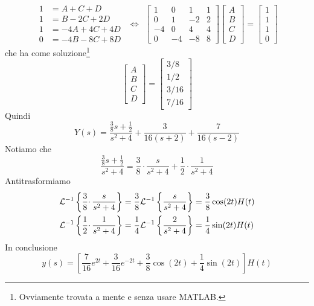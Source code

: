 \begin{equation*}
\begin{aligned}
1 & =A+C+D\\
1 & =B-2C+2D\\
1 & =-4A+4C+4D\\
0 & =-4B-8C+8D
\end{aligned} \ \ \iff \ \ \begin{bmatrix}
1 & 0 & 1 & 1\\
0 & 1 & -2 & 2\\
-4 & 0 & 4 & 4\\
0 & -4 & -8 & 8
\end{bmatrix}\begin{bmatrix}
A\\
B\\
C\\
D
\end{bmatrix} =\begin{bmatrix}
1\\
1\\
1\\
0
\end{bmatrix}
\end{equation*}
che ha come soluzione\footnote{Ovviamente trovata a mente e senza usare MATLAB.}
\begin{equation*}
\begin{bmatrix}
A\\
B\\
C\\
D
\end{bmatrix} =\begin{bmatrix}
3/8\\
1/2\\
3/16\\
7/16
\end{bmatrix}
\end{equation*}
Quindi
\begin{equation*}
Y( s) =\frac{\frac{3}{8} s+\frac{1}{2}}{s^{2} +4} +\frac{3}{16( s+2)} +\frac{7}{16( s-2)}
\end{equation*}
Notiamo che
\begin{equation*}
\frac{\frac{3}{8} s+\frac{1}{2}}{s^{2} +4} =\frac{3}{8} \cdotp \frac{s}{s^{2} +4} +\frac{1}{2} \cdotp \frac{1}{s^{2} +4}
\end{equation*}
Antitrasformiamo
\begin{align*}
\mathcal{L}^{-1}\left\{\frac{3}{8} \cdotp \frac{s}{s^{2} +4}\right\} & =\frac{3}{8}\mathcal{L}^{-1}\left\{\frac{s}{s^{2} +4}\right\} =\frac{3}{8}\cos( 2t) H( t)\\
\mathcal{L}^{-1}\left\{\frac{1}{2} \cdotp \frac{1}{s^{2} +4}\right\} & =\frac{1}{4}\mathcal{L}^{-1}\left\{\frac{2}{s^{2} +4}\right\} =\frac{1}{4}\sin( 2t) H( t)
\end{align*}
In conclusione
\begin{equation*}
y( s) =\left[\frac{7}{16} e^{2t} +\frac{3}{16} e^{-2t} +\frac{3}{8}\cos( 2t) +\frac{1}{4}\sin( 2t)\right] H( t)
\end{equation*}

